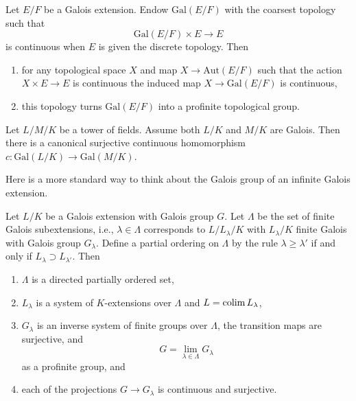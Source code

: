 \begin{lemma}\cite[\href{https://stacks.math.columbia.edu/tag/0BMJ}{Lemma 0BMJ}]{stacks-project}
	\label{lemma-galois-profinite}
	Let $E/F$ be a Galois extension. Endow $\text{Gal}(E/F)$ with the coarsest
	topology such that
	$$
		\text{Gal}(E/F) \times E \longrightarrow E
	$$
	is continuous when $E$ is given the discrete topology. Then
	\begin{enumerate}
		\item for any topological space $X$ and map $X \to \text{Aut}(E/F)$
		      such that the action $X \times E \to E$ is continuous the induced map
		      $X \to \text{Gal}(E/F)$ is continuous,
		\item this topology turns $\text{Gal}(E/F)$ into
		      a profinite topological group.
	\end{enumerate}
\end{lemma}



\begin{lemma}\cite[\href{https://stacks.math.columbia.edu/tag/0BMK}{Lemma 0BMK}]{stacks-project}
	\label{lemma-galois-infinite}
	Let $L/M/K$ be a tower of fields. Assume both $L/K$ and
	$M/K$ are Galois. Then there is a canonical surjective continuous
	homomorphism $c : \text{Gal}(L/K) \to \text{Gal}(M/K)$.
\end{lemma}



\noindent
Here is a more standard way to think about
the Galois group of an infinite Galois extension.

\begin{lemma}\cite[\href{https://stacks.math.columbia.edu/tag/0BU2}{Lemma 0BU2}]{stacks-project}
	\label{lemma-infinite-galois-limit}
	Let $L/K$ be a Galois extension with Galois group $G$.
	Let $\Lambda$ be the set of finite Galois subextensions,
	i.e., $\lambda \in \Lambda$ corresponds to $L/L_\lambda/K$
	with $L_\lambda/K$ finite Galois with Galois group $G_\lambda$.
	Define a partial ordering on $\Lambda$ by the rule
	$\lambda \geq \lambda'$ if and only if
	$L_\lambda \supset L_{\lambda'}$. Then
	\begin{enumerate}
		\item $\Lambda$ is a directed partially ordered set,
		\item $L_\lambda$ is a system of $K$-extensions over $\Lambda$
		      and $L = \mathop{\mathrm{colim}}\nolimits L_\lambda$,
		\item $G_\lambda$ is an inverse system of finite groups over $\Lambda$,
		      the transition maps are surjective, and
		      $$
			      G = \lim_{\lambda \in \Lambda} G_\lambda
		      $$
		      as a profinite group, and
		\item each of the projections $G \to G_\lambda$ is continuous and surjective.
	\end{enumerate}
\end{lemma}

